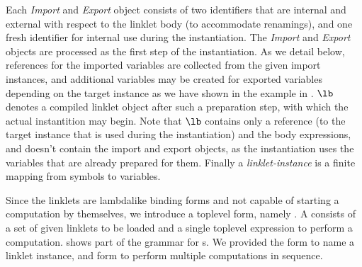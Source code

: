			\begin{paragraph-here}
				Each \emph{Import} and \emph{Export} object consists of two
				identifiers that are internal and external with respect to the linklet
				body (to accommodate renamings), and one fresh identifier for internal
				use during the instantiation. The \emph{Import} and \emph{Export}
				objects are processed as the first step of the instantiation. As we
				detail below, references for the imported variables are collected from
				the given import instances, and additional variables may be created
				for exported variables depending on the target instance as we have
				shown in the example in . $\lb$
				denotes a compiled linklet object after such a preparation step, with
				which the actual instantition may begin. Note that $\lb$ contains only
				a reference (to the target instance that is used during the
				instantiation) and the body expressions, and doesn't contain the
				import and export objects, as the instantiation uses the variables
				that are already prepared for them. Finally
				a \emph{linklet-instance} is a finite mapping from symbols to
				variables.
			\end{paragraph-here}

			\begin{paragraph-here}
				Since the linklets are lambda\dash like binding forms and not capable
				of starting a computation by themselves, we introduce a top\dash level
				form, namely . A  consists of
				a set of given linklets to be loaded and a single top\dash level
				expression to perform a computation. \figref{fig:linklet-program}
				shows part of the grammar for s. We provided
				the  form to name a linklet instance,
				and  form to perform multiple computations in
				sequence.
			\end{paragraph-here}

